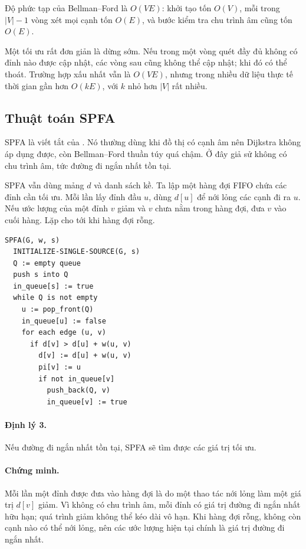 \documentclass[11pt]{article}
\begin{document}
Độ phức tạp của Bellman--Ford là \(O(VE)\): khởi tạo tốn \(O(V)\), mỗi trong
\(|V|-1\) vòng xét mọi cạnh tốn \(O(E)\), và bước kiểm tra chu trình âm cũng
tốn \(O(E)\).

Một tối ưu rất đơn giản là dừng sớm. Nếu trong một vòng quét đầy đủ không có
đỉnh nào được cập nhật, các vòng sau cũng không thể cập nhật; khi đó có thể
thoát. Trường hợp xấu nhất vẫn là \(O(VE)\), nhưng trong nhiều dữ liệu thực tế
thời gian gần hơn \(O(kE)\), với \(k\) nhỏ hơn \(|V|\) rất nhiều.

\subsection{Thuật toán SPFA}

SPFA là viết tắt của . Nó thường dùng khi
đồ thị có cạnh âm nên Dijkstra không áp dụng được, còn Bellman--Ford thuần túy
quá chậm. Ở đây giả sử không có chu trình âm, tức đường đi ngắn nhất tồn tại.

SPFA vẫn dùng mảng \(d\) và danh sách kề. Ta lập một hàng đợi FIFO chứa các
đỉnh cần tối ưu. Mỗi lần lấy đỉnh đầu \(u\), dùng \(d[u]\) để nới lỏng các
cạnh đi ra \(u\). Nếu ước lượng của một đỉnh \(v\) giảm và \(v\) chưa nằm
trong hàng đợi, đưa \(v\) vào cuối hàng. Lặp cho tới khi hàng đợi rỗng.

\begin{verbatim}
SPFA(G, w, s)
  INITIALIZE-SINGLE-SOURCE(G, s)
  Q := empty queue
  push s into Q
  in_queue[s] := true
  while Q is not empty
    u := pop_front(Q)
    in_queue[u] := false
    for each edge (u, v)
      if d[v] > d[u] + w(u, v)
        d[v] := d[u] + w(u, v)
        pi[v] := u
        if not in_queue[v]
          push_back(Q, v)
          in_queue[v] := true
\end{verbatim}

\paragraph{Định lý 3.}
Nếu đường đi ngắn nhất tồn tại, SPFA sẽ tìm được các giá trị tối ưu.

\paragraph{Chứng minh.}
Mỗi lần một đỉnh được đưa vào hàng đợi là do một thao tác nới lỏng làm một
giá trị \(d[v]\) giảm. Vì không có chu trình âm, mỗi đỉnh có giá trị đường đi
ngắn nhất hữu hạn; quá trình giảm không thể kéo dài vô hạn. Khi hàng đợi rỗng,
không còn cạnh nào có thể nới lỏng, nên các ước lượng hiện tại chính là giá
trị đường đi ngắn nhất.
\end{document}
